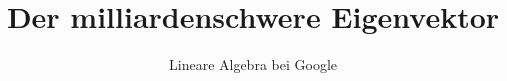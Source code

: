 \subject{\texttt{[image: pictures/google]}}
\title{Der milliardenschwere Eigenvektor}
\subtitle{Lineare Algebra bei Google}
\author{}
\date{}


